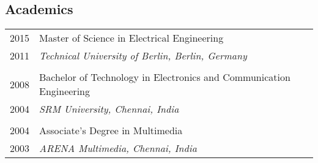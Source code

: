 \subsection{Academics}
\begin{longtable}
	{r|p{13cm}}

	\textsc{2015} & Master of Science in Electrical Engineering\\
	\textsc{2011}&\emph{Technical University of Berlin, Berlin, Germany}\\
	\multicolumn{2}{c}{} \\

	\textsc{2008} & Bachelor of Technology in Electronics and Communication Engineering\\
	\textsc{2004}&\emph{SRM University, Chennai, India}\\
	\multicolumn{2}{c}{} \\

	\textsc{2004} & Associate's Degree in Multimedia\\
	\textsc{2003}&\emph{ARENA Multimedia, Chennai, India}\\

\end{longtable}
